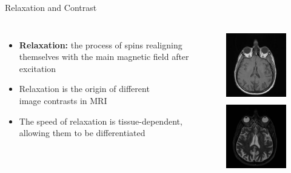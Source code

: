 \begin{frame}{Relaxation and Contrast}

    \begin{columns}[c,onlytextwidth]
        \begin{itemize}
            \item \textbf{Relaxation:} the process of spins realigning themselves with the main magnetic field  after excitation
            \item Relaxation is the origin of different \\ image contrasts in MRI
            \item The speed of relaxation is tissue-dependent, allowing them to be differentiated
        \end{itemize}

        \begin{figure}
            \centering
            \includegraphics[height=3cm]{images/5009-dkfz-t1}

            \includegraphics[height=3cm]{images/5009-dkfz-t2}
        \end{figure}
    \end{columns}
\end{frame}

